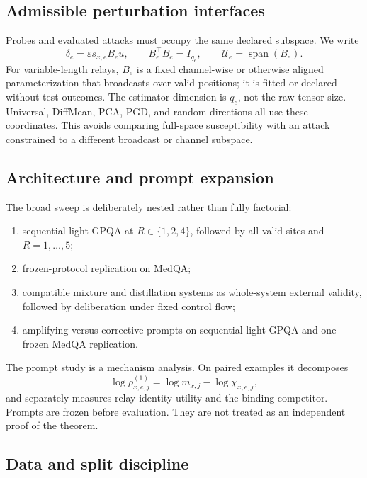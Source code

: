 \documentclass[11pt]{article}
\newcommand{\eps}{\varepsilon}
\begin{document}
\subsection{Admissible perturbation interfaces}

Probes and evaluated attacks must occupy the same declared subspace. We write
\begin{equation}
    \delta_e=\eps s_{x,e}B_eu,
    \qquad B_e^\top B_e=I_{q_e},
    \qquad \mathcal U_e=\operatorname{span}(B_e).
    \label{eq:subspace-parameterization}
\end{equation}
For variable-length relays, \(B_e\) is a fixed channel-wise or otherwise
aligned parameterization that broadcasts over valid positions; it is fitted or
declared without test outcomes. The estimator dimension is \(q_e\), not the
raw tensor size. Universal, DiffMean, PCA, PGD, and random directions all use
these coordinates. This avoids comparing full-space susceptibility with an
attack constrained to a different broadcast or channel subspace.

\subsection{Architecture and prompt expansion}

The broad sweep is deliberately nested rather than fully factorial:
\begin{enumerate}
    \item sequential-light GPQA at \(R\in\{1,2,4\}\), followed by all valid
    sites and \(R=1,\ldots,5\);
    \item frozen-protocol replication on MedQA;
    \item compatible mixture and distillation systems as whole-system external
    validity, followed by deliberation under fixed control flow;
    \item amplifying versus corrective prompts on sequential-light GPQA and one
    frozen MedQA replication.
\end{enumerate}
The prompt study is a mechanism analysis. On paired examples it decomposes
\begin{equation}
    \log\rho^{(1)}_{x,e,j}
    =\log m_{x,j}-\log\chi_{x,e,j},
    \label{eq:prompt-decomposition}
\end{equation}
and separately measures relay identity utility and the binding competitor.
Prompts are frozen before evaluation. They are not treated as an independent
proof of the theorem.

\subsection{Data and split discipline}
\end{document}
